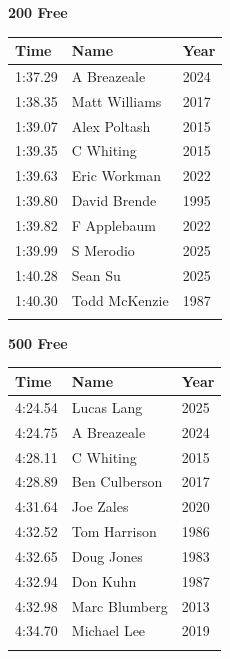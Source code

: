 \vspace{0.5em}
\noindent\begin{minipage}[t]{0.48\textwidth}
\centering
\textbf{\textcolor{teamprimary}{200 Free}}\par
\vspace{0.5em}
\centering
\small
\renewcommand{\arraystretch}{1.0}
\setlength{\tabcolsep}{4pt}
\begin{tabular}{@{}p{1.8cm}p{3.0cm}p{1.0cm}@{}}
\toprule
\textbf{Time} & \textbf{Name} & \textbf{Year} \\
\midrule
1:37.29 & A Breazeale & 2024 \\
1:38.35 & Matt Williams & 2017 \\
1:39.07 & Alex Poltash & 2015 \\
1:39.35 & C Whiting & 2015 \\
1:39.63 & Eric Workman & 2022 \\
1:39.80 & David Brende & 1995 \\
1:39.82 & F Applebaum & 2022 \\
1:39.99 & S Merodio & 2025 \\
1:40.28 & Sean Su & 2025 \\
1:40.30 & Todd McKenzie & 1987 \\
\bottomrule
\vspace{0.5em}
\end{tabular}
\end{minipage}
\hfill
\begin{minipage}[t]{0.48\textwidth}
\centering
\textbf{\textcolor{teamprimary}{500 Free}}\par
\vspace{0.5em}
\centering
\small
\renewcommand{\arraystretch}{1.0}
\setlength{\tabcolsep}{4pt}
\begin{tabular}{@{}p{1.8cm}p{3.0cm}p{1.0cm}@{}}
\toprule
\textbf{Time} & \textbf{Name} & \textbf{Year} \\
\midrule
4:24.54 & Lucas Lang & 2025 \\
4:24.75 & A Breazeale & 2024 \\
4:28.11 & C Whiting & 2015 \\
4:28.89 & Ben Culberson & 2017 \\
4:31.64 & Joe Zales & 2020 \\
4:32.52 & Tom Harrison & 1986 \\
4:32.65 & Doug Jones & 1983 \\
4:32.94 & Don Kuhn & 1987 \\
4:32.98 & Marc Blumberg & 2013 \\
4:34.70 & Michael Lee & 2019 \\
\bottomrule
\vspace{0.5em}
\end{tabular}
\end{minipage}
